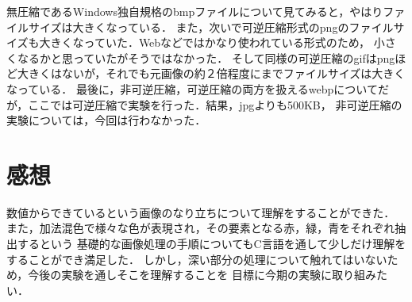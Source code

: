 \documentclass[11pt]{jarticle}
\begin{document}
無圧縮であるWindows独自規格のbmpファイルについて見てみると，やはりファイルサイズは大きくなっている．
また，次いで可逆圧縮形式のpngのファイルサイズも大きくなっていた．Webなどではかなり使われている形式のため，
小さくなるかと思っていたがそうではなかった．
そして同様の可逆圧縮のgifはpngほど大きくはないが，それでも元画像の約２倍程度にまでファイルサイズは大きくなっている．
最後に，非可逆圧縮，可逆圧縮の両方を扱えるwebpについてだが，ここでは可逆圧縮で実験を行った．結果，jpgよりも500KB，
非可逆圧縮の実験については，今回は行わなかった．

\section{感想}
数値からできているという画像のなり立ちについて理解をすることができた．
また，加法混色で様々な色が表現され，その要素となる赤，緑，青をそれぞれ抽出するという
基礎的な画像処理の手順についてもC言語を通して少しだけ理解をすることができ満足した．
しかし，深い部分の処理について触れてはいないため，今後の実験を通しそこを理解することを
目標に今期の実験に取り組みたい．
\end{document}
